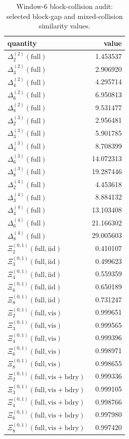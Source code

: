 \begin{table}[H]
\centering
\scriptsize
\setlength{\tabcolsep}{5pt}
\caption{Window-6 block-collision audit: selected block-gap and mixed-collision similarity values.}
\label{tab:window6_block_collision_audit}
\begin{tabular}{l r}
\toprule
quantity & value\\
\midrule
$\Delta_{2}^{(2)}(\mathrm{full})$ & 1.453537\\
$\Delta_{3}^{(2)}(\mathrm{full})$ & 2.906920\\
$\Delta_{4}^{(2)}(\mathrm{full})$ & 4.295714\\
$\Delta_{6}^{(2)}(\mathrm{full})$ & 6.950813\\
$\Delta_{8}^{(2)}(\mathrm{full})$ & 9.531477\\
$\Delta_{2}^{(3)}(\mathrm{full})$ & 2.956481\\
$\Delta_{3}^{(3)}(\mathrm{full})$ & 5.901785\\
$\Delta_{4}^{(3)}(\mathrm{full})$ & 8.708399\\
$\Delta_{6}^{(3)}(\mathrm{full})$ & 14.072313\\
$\Delta_{8}^{(3)}(\mathrm{full})$ & 19.287446\\
$\Delta_{2}^{(4)}(\mathrm{full})$ & 4.453618\\
$\Delta_{3}^{(4)}(\mathrm{full})$ & 8.884132\\
$\Delta_{4}^{(4)}(\mathrm{full})$ & 13.103408\\
$\Delta_{6}^{(4)}(\mathrm{full})$ & 21.166302\\
$\Delta_{8}^{(4)}(\mathrm{full})$ & 29.005603\\
\midrule
$\Xi_{2}^{(0,1)}(\mathrm{full},\mathrm{iid})$ & 0.410107\\
$\Xi_{3}^{(0,1)}(\mathrm{full},\mathrm{iid})$ & 0.499623\\
$\Xi_{4}^{(0,1)}(\mathrm{full},\mathrm{iid})$ & 0.559359\\
$\Xi_{6}^{(0,1)}(\mathrm{full},\mathrm{iid})$ & 0.650189\\
$\Xi_{8}^{(0,1)}(\mathrm{full},\mathrm{iid})$ & 0.731247\\
$\Xi_{2}^{(0,1)}(\mathrm{full},\mathrm{vis})$ & 0.999651\\
$\Xi_{3}^{(0,1)}(\mathrm{full},\mathrm{vis})$ & 0.999565\\
$\Xi_{4}^{(0,1)}(\mathrm{full},\mathrm{vis})$ & 0.999396\\
$\Xi_{6}^{(0,1)}(\mathrm{full},\mathrm{vis})$ & 0.998971\\
$\Xi_{8}^{(0,1)}(\mathrm{full},\mathrm{vis})$ & 0.998655\\
$\Xi_{2}^{(0,1)}(\mathrm{full},\mathrm{vis+bdry})$ & 0.999336\\
$\Xi_{3}^{(0,1)}(\mathrm{full},\mathrm{vis+bdry})$ & 0.999105\\
$\Xi_{4}^{(0,1)}(\mathrm{full},\mathrm{vis+bdry})$ & 0.998766\\
$\Xi_{6}^{(0,1)}(\mathrm{full},\mathrm{vis+bdry})$ & 0.997980\\
$\Xi_{8}^{(0,1)}(\mathrm{full},\mathrm{vis+bdry})$ & 0.997420\\
\bottomrule
\end{tabular}
\end{table}
